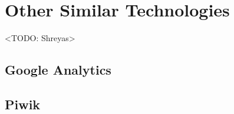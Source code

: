 \section{Other Similar Technologies} \label{similartech}
<TODO: Shreyas>

\subsection{Google Analytics}

\subsection{Piwik}
